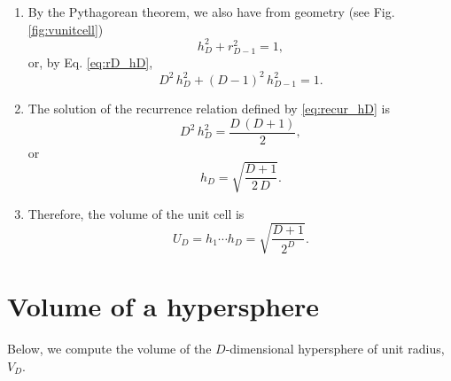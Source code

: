 \documentclass{article}
\begin{document}
\begin{enumerate}
\item
By the Pythagorean theorem, we also have
from geometry (see Fig. \ref{fig:vunitcell})
\begin{equation}
  h_D^2 + r_{D - 1}^2 = 1,
\end{equation}
or, by Eq. \eqref{eq:rD_hD},
\begin{equation}
  D^2 \, h_D^2 + (D - 1)^2 \, h_{D - 1}^2 = 1.
  \label{eq:recur_hD}
\end{equation}

\item
The solution of the recurrence relation
defined by \eqref{eq:recur_hD} is
$$
D^2 \, h_D^2 = \frac{ D \, (D+1) } { 2 },
$$
or
\begin{equation}
  h_D
  =
  \sqrt 
  {
  \frac{ D + 1 }
       { 2 \, D }
  }
  .
  \label{eq:hD}
\end{equation}

\item
Therefore, the volume of the unit cell is
$$
  U_D
  = h_1 \cdots h_D
  = \sqrt{ 
    \frac{ D + 1 }
         {  2^D  }
    }.
$$

\end{enumerate}



\section{Volume of a hypersphere}

Below, we compute the volume of the $D$-dimensional hypersphere
of unit radius, $V_D$.
\end{document}
